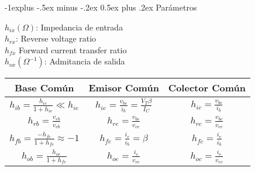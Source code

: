 \documentclass[10pt,landscape]{article}
\makeatletter
\renewcommand{\subsection}{\@startsection{subsection}{2}{0mm}%
                                {-1explus -.5ex minus -.2ex}%
                                {0.5ex plus .2ex}%
                                {\normalfont\normalsize\bfseries}}
\makeatother
\begin{document}
\begin{multicols}{3}
\begin{center}
		
		
	\end{center}

\subsection{Parámetros}

$h_{ix} (\Omega)$: Impedancia de entrada\\

$h_{rx}$: Reverse voltage ratio \\

$h_{fx}$ Forward current transfer ratio\\

$h_{ox} (\Omega^{-1})$: Admitancia de salida\\ 


\begin{tabular}{| c | c | c |}
\hline
Base Común                              & Emisor Común & Colector Común \\ \hline
    $\displaystyle h_{ib} = \frac{h_{ie}}{1 + h_{ie}} \ll h_{ie}$       &  $\displaystyle h_{ie} = \frac{v_{be}}{i_b} = \frac{V_{T} \beta}{I_{C}}$            &   $\displaystyle h_{ic} = \frac{v_{bc}}{i_b}$             \\ \hline
    $\displaystyle h_{rb} = \frac{v_{eb}}{v_{cb}}$   &   $\displaystyle h_{re} = \frac{v_{be}}{v_{ce}}$           &   $\displaystyle h_{rc} = \frac{v_{bc}}{v_{ec}}$             \\ \hline
    $\displaystyle h_{fb} = \frac{-h_{fe}}{1 + h_{fe}} \approx -1$       &  $\displaystyle h_{fe} = \frac{i_{c}}{i_{b}} = \beta$            &    $\displaystyle h_{fc} = \frac{i_{e}}{i_{b}}$            \\ \hline
     $\displaystyle h_{ob} = \frac{h_{oe}}{1 + h_{fe}}$      &       $\displaystyle h_{oe} = \frac{i_{c}}{v_{ce}}$       &     $\displaystyle h_{oc} = \frac{i_{e}}{v_{ec}}$           \\ \hline
\end{tabular}


\end{multicols}
\end{document}
